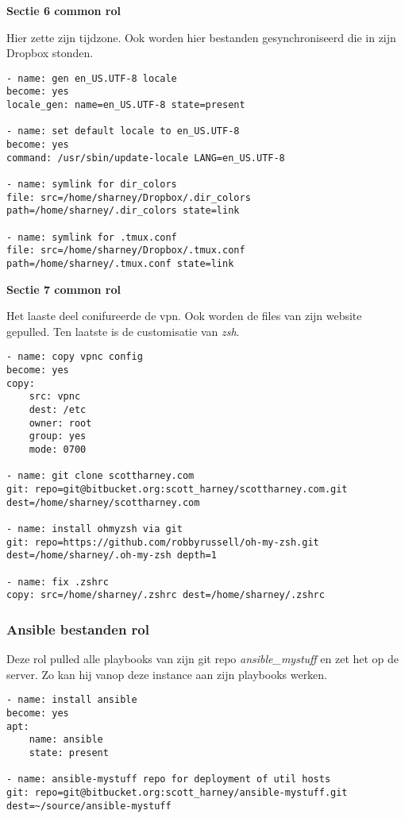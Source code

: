 \textbf{Sectie 6 common rol}

Hier zette \autocite{commonscottharney} zijn tijdzone. Ook worden hier bestanden gesynchroniseerd die in zijn Dropbox stonden.
\begin{lstlisting}
- name: gen en_US.UTF-8 locale
become: yes
locale_gen: name=en_US.UTF-8 state=present

- name: set default locale to en_US.UTF-8
become: yes
command: /usr/sbin/update-locale LANG=en_US.UTF-8

- name: symlink for dir_colors
file: src=/home/sharney/Dropbox/.dir_colors path=/home/sharney/.dir_colors state=link

- name: symlink for .tmux.conf
file: src=/home/sharney/Dropbox/.tmux.conf path=/home/sharney/.tmux.conf state=link
\end{lstlisting}

\newpage
\textbf{Sectie 7 common rol}

Het laaste deel conifureerde de vpn. Ook worden de files van zijn website gepulled. Ten laatste is de customisatie van \textit{zsh}.
\begin{lstlisting}
- name: copy vpnc config
become: yes
copy:
    src: vpnc
    dest: /etc
    owner: root
    group: yes
    mode: 0700 

- name: git clone scottharney.com
git: repo=git@bitbucket.org:scott_harney/scottharney.com.git dest=/home/sharney/scottharney.com

- name: install ohmyzsh via git
git: repo=https://github.com/robbyrussell/oh-my-zsh.git  dest=/home/sharney/.oh-my-zsh depth=1 

- name: fix .zshrc
copy: src=/home/sharney/.zshrc dest=/home/sharney/.zshrc
\end{lstlisting}

\subsubsection{Ansible bestanden rol}
Deze rol pulled alle playbooks van \autocite{scottharney} zijn git repo \textit{ansible\_mystuff} en zet het op de server. Zo kan hij vanop deze instance aan zijn playbooks werken.
\begin{lstlisting}
- name: install ansible 
become: yes
apt:
    name: ansible
    state: present

- name: ansible-mystuff repo for deployment of util hosts
git: repo=git@bitbucket.org:scott_harney/ansible-mystuff.git  dest=~/source/ansible-mystuff    
\end{lstlisting}

